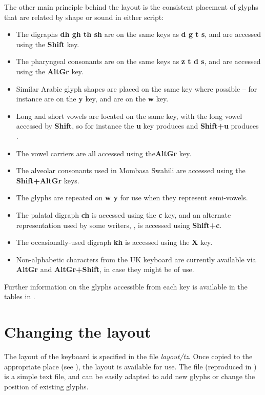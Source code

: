 The other main principle behind the layout is the consistent placement of glyphs that are related by shape or sound in either script:
\begin{itemize}
\item The digraphs \textbf{dh gh th sh} are on the same keys as \textbf{d g t s}, and are accessed using the \textbf{Shift} key.
\item The pharyngeal consonants  are on the same keys as \textbf{z t d s}, and are accessed using the \textbf{AltGr} key.
\item Similar Arabic glyph shapes are placed on the same key where possible -- for instance  are on the \textbf{y} key, and  are on the \textbf{w} key.
\item Long and short vowels are located on the same key, with the long vowel accessed by \textbf{Shift}, so for instance the \textbf{u} key produces  and \textbf{Shift+u} produces .
\item The vowel carriers  are all accessed using the\textbf{AltGr} key.
\item The alveolar consonants  used in Mombasa Swahili are accessed using the \textbf{Shift+AltGr} keys.
\item The glyphs  are repeated on \textbf{w y} for use when they represent semi-vowels.
\item The palatal digraph \textbf{ch} is accessed using the \textbf{c} key, and an alternate representation used by some writers, , is accessed using \textbf{Shift+c}.
\item The occasionally-used digraph \textbf{kh} is accessed using the \textbf{X} key.
\item Non-alphabetic characters from the UK keyboard are currently available via \textbf{AltGr} and \textbf{AltGr+Shift}, in case they might be of use.
\end{itemize}

Further information on the glyphs accessible from each key is available in the tables in .

\section{Changing the layout}
\label{s:changelayout}

The layout of the keyboard is specified in the file \textit{layout/tz}.  Once copied to the appropriate place (see ), the layout is available for use.  The file (reproduced in ) is a simple text file, and can be easily adapted to add new glyphs or change the position of existing glyphs.

